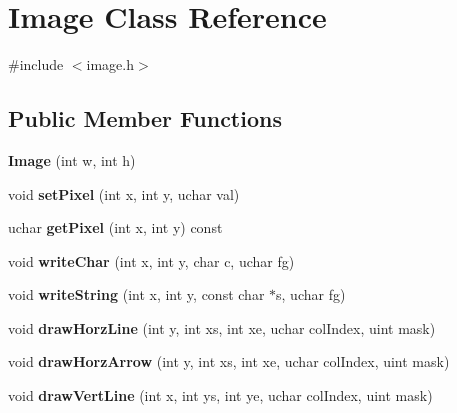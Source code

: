 \hypertarget{class_image}{}\section{Image Class Reference}
\label{class_image}


{\ttfamily \#include $<$image.\+h$>$}

\subsection*{Public Member Functions}
\begin{DoxyCompactItemize}
\item 
\mbox{\label{class_image_a05c964ca59502cc32c30e8ab89b5e920}} 
{\bfseries Image} (int w, int h)
\item 
\mbox{\label{class_image_ac05a72f347421d0b00091faed2216393}} 
void {\bfseries set\+Pixel} (int x, int y, uchar val)
\item 
\mbox{\label{class_image_a29006b44f5fc3ddc53bc60a196c0fc9b}} 
uchar {\bfseries get\+Pixel} (int x, int y) const
\item 
\mbox{\label{class_image_aa1af4353b607e32f3998045574697543}} 
void {\bfseries write\+Char} (int x, int y, char c, uchar fg)
\item 
\mbox{\label{class_image_a0f9e1b9dbb51e3c046f1736f33f7a1f9}} 
void {\bfseries write\+String} (int x, int y, const char $\ast$s, uchar fg)
\item 
\mbox{\label{class_image_a72e5036b6f5976a361a91381bde4e5c4}} 
void {\bfseries draw\+Horz\+Line} (int y, int xs, int xe, uchar col\+Index, uint mask)
\item 
\mbox{\label{class_image_a4fba4fc168bfae61e0e7b5856c36d922}} 
void {\bfseries draw\+Horz\+Arrow} (int y, int xs, int xe, uchar col\+Index, uint mask)
\item 
\mbox{\label{class_image_a75bbaa68f25757917e87d08fd9d02606}} 
void {\bfseries draw\+Vert\+Line} (int x, int ys, int ye, uchar col\+Index, uint mask)
\item 
\mbox{\label{class_image_a6b9baea7dac381277b7df7eab9d0fc4e}} 

\end{DoxyCompactItemize}
